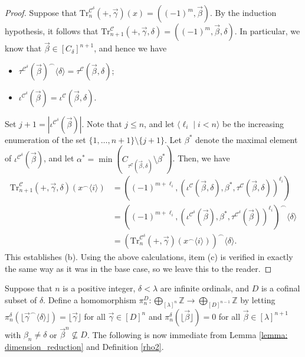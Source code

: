 \documentclass{amsart}
\numberwithin{theorem}{section}
\theoremstyle{definition}
\newcommand{\bb}{\mathbb}
\newcommand{\mc}{\mathcal}
\newcommand{\ra}{\rightarrow}
\newcommand{\Tr}{\mathrm{Tr}}
\begin{document}
\begin{proof}
  Suppose that $\Tr^{\mc{C}^\delta}_n(+,\vec{\gamma})(x) = 
  ((-1)^m, \vec{\beta})$. By the induction hypothesis, it follows that 
  $\Tr^{\mc{C}}_{n+1}(+,\vec{\gamma},\delta) = ((-1)^m, \vec{\beta}, 
  \delta)$. In particular, we know that $\vec{\beta} \in [C_\delta]^{n+1}$, 
  and hence we have
  \begin{itemize}
    \item $\tau^{\mc{C}^\delta}(\vec{\beta})^\frown \langle \delta \rangle 
    = \tau^{\mc{C}}(\vec{\beta},\delta)$;
    \item $\iota^{\mc{C}^\delta}(\vec{\beta}) = \iota^{\mc{C}}(\vec{\beta}, 
    \delta)$.
  \end{itemize}
  Set $j + 1 = |\iota^{\mc{C}^\delta}(\vec{\beta})|$. Note that 
  $j \leq n$, and let $\langle \ell_i \mid i < n \rangle$ be the increasing 
  enumeration of the set $\{1, \ldots, n+1\} \setminus \{j+1\}$. 
  Let $\beta^*$ denote the maximal element of $\iota^{\mc{C}^\delta}(\vec{\beta})$, 
  and let $\alpha^* = \min(C_{\tau^{\mc{C}}(\vec{\beta},\delta)} 
  \setminus \beta^*)$. Then, we have
  \begin{align*}
    \Tr^{\mc{C}}_{n+1}(+,\vec{\gamma},\delta)(x^\frown \langle i \rangle) 
    & = ((-1)^{m+\ell_i}, (\iota^{\mc{C}}(\vec{\beta},\delta), 
    \beta^*, \tau^{\mc{C}}(\vec{\beta},\delta))^{\ell_i}) \\ 
    & = ((-1)^{m + \ell_i}, (\iota^{\mc{C}^\delta}(\vec{\beta}), 
    \beta^*, \tau^{\mc{C}^\delta}(\vec{\beta}))^{\ell_i}) ^\frown \langle 
    \delta \rangle \\ 
    & = (\Tr^{\mc{C}^\delta}_n(+,\vec{\gamma})(x^\frown \langle i 
    \rangle))^\frown \langle \delta \rangle.
  \end{align*}
  This establishes (b). Using the above calculations, item (c) is verified in 
  exactly the same way as it was in the base case, so we leave this to the 
  reader.
\end{proof}

Suppose that $n$ is a positive integer, $\delta < \lambda$ are infinite 
ordinals, and $D$ is a cofinal subset of $\delta$. Define a homomorphism $\pi^D_n : \bigoplus_{[\lambda]^n} 
\bb{Z} \ra \bigoplus_{[D]^{n-1}} \bb{Z}$ by letting 
$\pi^\delta_n(\lfloor \vec{\gamma}^\frown \langle \delta \rangle 
\rfloor) = \lfloor \vec{\gamma} \rfloor$ for all 
$\vec{\gamma} \in [D]^n$ and $\pi^\delta_n(\lfloor \vec{\beta} 
\rfloor) = 0$ for all $\vec{\beta} \in [\lambda]^{n+1}$ with 
$\beta_n \neq \delta$ or $\vec{\beta}^n \not\subseteq D$. 
The following is now immediate from Lemma \ref{lemma: dimension_reduction} and 
Definition \ref{rho2}.
\end{document}
